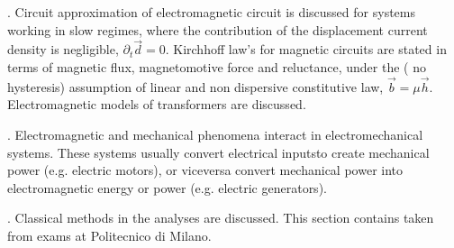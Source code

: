\documentclass[letterpaper,10pt,english]{jupyterBook}
\begin{document}
\sphinxAtStartPar
{\hyperref[\detokenize{ch/circuits-electromagnetic:classical-electromagnetism-circuits-electromagnetic}]{}}. Circuit approximation of electromagnetic circuit is discussed for systems working in slow regimes, where the contribution of the displacement current density is negligible, \(\partial_t \vec{d} = 0\). Kirchhoff law’s for magnetic circuits are stated in terms of magnetic flux, magnetomotive force and reluctance, under the ( no hysteresis) assumption of linear and non dispersive constitutive law, \(\vec{b} = \mu \vec{h}\). Electromagnetic models of transformers are discussed.

\sphinxAtStartPar
{\hyperref[\detokenize{ch/circuits-electromechanic-old:classical-electromagnetism-circuits-electromechanic}]{}}. Electromagnetic and mechanical phenomena interact in electromechanical systems. These systems usually convert electrical inputsto create mechanical power (e.g. electric motors), or viceversa convert mechanical power into electromagnetic energy or power (e.g. electric generators).

\sphinxAtStartPar
{\hyperref[\detokenize{ch/electrical-engineering-networks:classical-electromagnetism-electrical-engineering-newtork-analysis}]{}}. Classical methods in the analyses are discussed. This section contains {\hyperref[\detokenize{ch/electrical-engineering-exercises:classical-electromagnetism-electrical-engineering-exercises}]{}} taken from exams at Politecnico di Milano.



\sphinxstepscope
\end{document}
